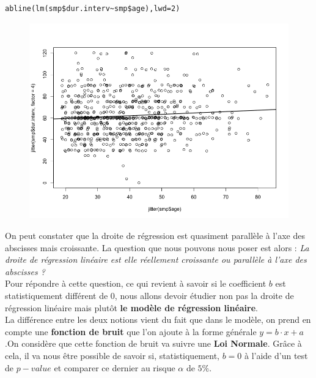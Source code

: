 \begin{lstlisting}[language=html]
abline(lm(smp$dur.interv~smp$age),lwd=2)
\end{lstlisting}	
\begin{figure}[H]\begin{center}\includegraphics[scale=0.35]{ilu/cs.png}\end{center}\end{figure} 
On peut constater que la droite de régression est quasiment parallèle à l'axe des abscisses mais croissante. \newline
La question que nous pouvons nous poser est alors : \textit{La droite de régression linéaire est elle réellement croissante ou parallèle à l'axe des abscisses ?}\newline
\\
Pour répondre à cette question, ce qui revient à savoir si le coefficient $b$ est statistiquement différent de $0$, nous allons devoir étudier non pas la droite de régression linéaire mais plutôt \textbf{le modèle de régression linéaire}.\newline
\\
La différence entre les deux notions vient du fait que dans le modèle, on prend en compte une \textbf{fonction de bruit} que l'on ajoute à la forme générale $y =b\cdot x + a$.\newline On considère que cette fonction de bruit va suivre une \textbf{Loi Normale}. Grâce à cela, il va nous être possible de savoir si, statistiquement, $b = 0$ à l'aide d'un test de $p-value$ et comparer ce dernier au risque $\alpha$ de $5\%$.\newline

